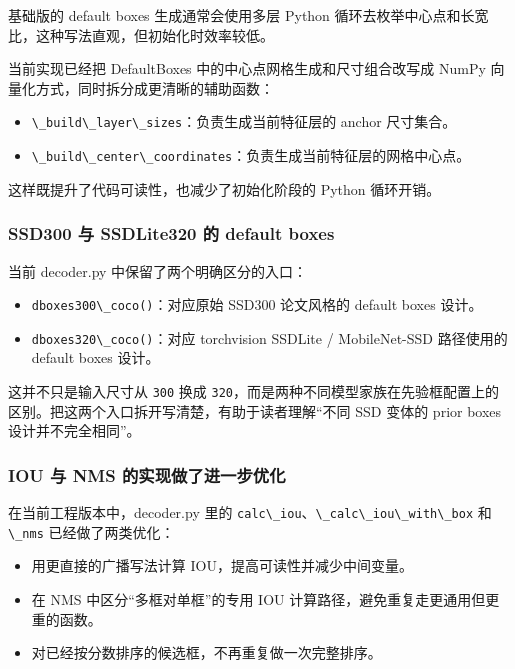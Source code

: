 基础版的 default boxes 生成通常会使用多层 Python
循环去枚举中心点和长宽比，这种写法直观，但初始化时效率较低。

当前实现已经把 DefaultBoxes 中的中心点网格生成和尺寸组合改写成 NumPy
向量化方式，同时拆分成更清晰的辅助函数：

\begin{itemize}
\tightlist
\item
  \passthrough{\lstinline!\_build\_layer\_sizes!}：负责生成当前特征层的
  anchor 尺寸集合。
\item
  \passthrough{\lstinline!\_build\_center\_coordinates!}：负责生成当前特征层的网格中心点。
\end{itemize}

这样既提升了代码可读性，也减少了初始化阶段的 Python 循环开销。

\subsubsection{SSD300 与 SSDLite320 的 default
boxes}\label{src-experiment-case2-h75}

当前 decoder.py 中保留了两个明确区分的入口：

\begin{itemize}
\tightlist
\item
  \passthrough{\lstinline!dboxes300\_coco()!}：对应原始 SSD300
  论文风格的 default boxes 设计。
\item
  \passthrough{\lstinline!dboxes320\_coco()!}：对应 torchvision SSDLite
  / MobileNet-SSD 路径使用的 default boxes 设计。
\end{itemize}

这并不只是输入尺寸从 \passthrough{\lstinline!300!} 换成
\passthrough{\lstinline!320!}，而是两种不同模型家族在先验框配置上的区别。把这两个入口拆开写清楚，有助于读者理解``不同
SSD 变体的 prior boxes 设计并不完全相同''。

\subsubsection{IOU 与 NMS
的实现做了进一步优化}\label{src-experiment-case2-h76}

在当前工程版本中，decoder.py 里的
\passthrough{\lstinline!calc\_iou!}、\passthrough{\lstinline!\_calc\_iou\_with\_box!}
和 \passthrough{\lstinline!\_nms!} 已经做了两类优化：

\begin{itemize}
\tightlist
\item
  用更直接的广播写法计算 IOU，提高可读性并减少中间变量。
\item
  在 NMS 中区分``多框对单框''的专用 IOU
  计算路径，避免重复走更通用但更重的函数。
\item
  对已经按分数排序的候选框，不再重复做一次完整排序。
\end{itemize}


